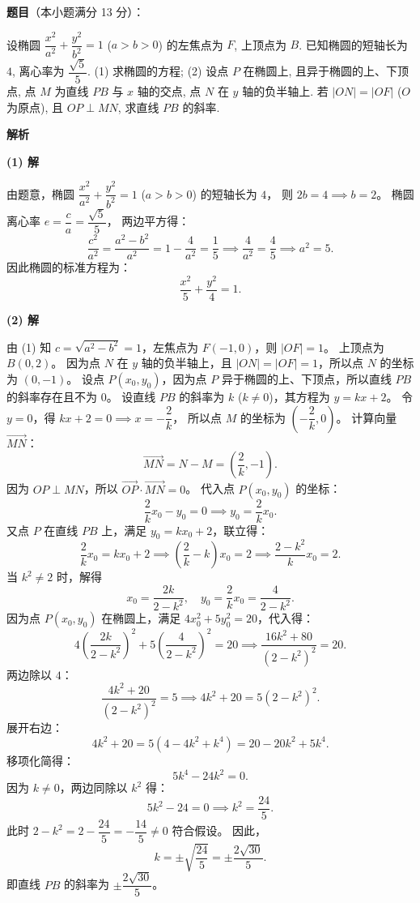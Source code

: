 \begin{answer}

\textbf{题目}（本小题满分 13 分）：

设椭圆 $\dfrac{x^2}{a^2} + \dfrac{y^2}{b^2} = 1$ ($a > b > 0$) 的左焦点为 $F$, 上顶点为 $B$. 已知椭圆的短轴长为 $4$, 离心率为 $\dfrac{\sqrt{5}}{5}$.
(1) 求椭圆的方程;
(2) 设点 $P$ 在椭圆上, 且异于椭圆的上、下顶点, 点 $M$ 为直线 $PB$ 与 $x$ 轴的交点, 点 $N$ 在 $y$ 轴的负半轴上. 若 $|ON| = |OF|$ ($O$ 为原点), 且 $OP \perp MN$, 求直线 $PB$ 的斜率.

\textbf{解析}

\textbf{(1) 解}

由题意，椭圆 $\dfrac{x^2}{a^2} + \dfrac{y^2}{b^2} = 1$ ($a > b > 0$) 的短轴长为 $4$，
则 $2b = 4 \implies b = 2$。
椭圆离心率 $e = \dfrac{c}{a} = \dfrac{\sqrt{5}}{5}$，
两边平方得：
\nopagebreak[4]
\[\frac{c^2}{a^2} = \frac{a^2 - b^2}{a^2} = 1 - \frac{4}{a^2} = \frac{1}{5} \implies \frac{4}{a^2} = \frac{4}{5} \implies a^2 = 5.\]
因此椭圆的标准方程为：
\nopagebreak[4]
\[\frac{x^2}{5} + \frac{y^2}{4} = 1.\]

\textbf{(2) 解}

由 (1) 知 $c = \sqrt{a^2 - b^2} = 1$，左焦点为 $F(-1, 0)$，则 $|OF| = 1$。
上顶点为 $B(0, 2)$。
因为点 $N$ 在 $y$ 轴的负半轴上，且 $|ON| = |OF| = 1$，所以点 $N$ 的坐标为 $(0, -1)$。
设点 $P(x_0, y_0)$，因为点 $P$ 异于椭圆的上、下顶点，所以直线 $PB$ 的斜率存在且不为 $0$。
设直线 $PB$ 的斜率为 $k$ ($k \neq 0$)，其方程为 $y = kx + 2$。
令 $y = 0$，得 $kx + 2 = 0 \implies x = -\dfrac{2}{k}$，
所以点 $M$ 的坐标为 $\left(-\dfrac{2}{k}, 0\right)$。
计算向量 $\vec{MN}$：
\nopagebreak[4]
\[\vec{MN} = N - M = \left(\frac{2}{k}, -1\right).\]
因为 $OP \perp MN$，所以 $\vec{OP} \cdot \vec{MN} = 0$。
代入点 $P(x_0, y_0)$ 的坐标：
\nopagebreak[4]
\[\frac{2}{k} x_0 - y_0 = 0 \implies y_0 = \frac{2}{k} x_0.\]
又点 $P$ 在直线 $PB$ 上，满足 $y_0 = kx_0 + 2$，联立得：
\nopagebreak[4]
\[\frac{2}{k} x_0 = kx_0 + 2 \implies \left(\frac{2}{k} - k\right) x_0 = 2 \implies \frac{2 - k^2}{k} x_0 = 2.\]
当 $k^2 \neq 2$ 时，解得
\nopagebreak[4]
\[x_0 = \frac{2k}{2 - k^2},\quad y_0 = \frac{2}{k} x_0 = \frac{4}{2 - k^2}.\]
因为点 $P(x_0, y_0)$ 在椭圆上，满足 $4x_0^2 + 5y_0^2 = 20$，代入得：
\nopagebreak[4]
\[4 \left(\frac{2k}{2 - k^2}\right)^2 + 5 \left(\frac{4}{2 - k^2}\right)^2 = 20 \implies \frac{16k^2 + 80}{(2 - k^2)^2} = 20.\]
两边除以 $4$：
\nopagebreak[4]
\[\frac{4k^2 + 20}{(2 - k^2)^2} = 5 \implies 4k^2 + 20 = 5(2 - k^2)^2.\]
展开右边：
\nopagebreak[4]
\[4k^2 + 20 = 5(4 - 4k^2 + k^4) = 20 - 20k^2 + 5k^4.\]
移项化简得：
\nopagebreak[4]
\[5k^4 - 24k^2 = 0.\]
因为 $k \neq 0$，两边同除以 $k^2$ 得：
\nopagebreak[4]
\[5k^2 - 24 = 0 \implies k^2 = \frac{24}{5}.\]
此时 $2 - k^2 = 2 - \dfrac{24}{5} = -\dfrac{14}{5} \neq 0$ 符合假设。
因此，
\nopagebreak[4]
\[k = \pm\sqrt{\frac{24}{5}} = \pm\frac{2\sqrt{30}}{5}.\]
即直线 $PB$ 的斜率为 $\pm\dfrac{2\sqrt{30}}{5}$。


\end{answer}
